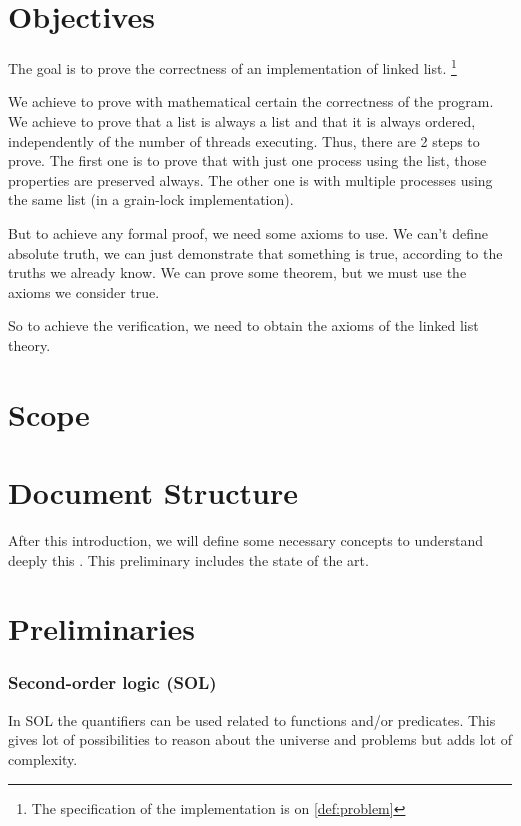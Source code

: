 \section{Objectives}

The goal is to prove the correctness of an implementation of linked list. \footnote{The specification of the implementation is on \ref{def:problem}}

We achieve to prove with mathematical certain the correctness of the program. We achieve to prove that a list is always a list and that it is always ordered, independently of the number of threads executing. Thus, there are 2 steps to prove. The first one is to prove that with just one process using the list, those properties are preserved always. The other one is with multiple processes using the same list (in a grain-lock implementation).

But to achieve any formal proof, we need some axioms to use.
We can't define absolute truth, we can just demonstrate that something is true, according to the truths we already know. 
We can prove some theorem, but we must use the axioms we consider true. 

So to achieve the verification, we need to obtain the axioms of the linked list theory.

\section{Scope}


\label{def:leap}

\section{Document Structure}

After this introduction, we will define some necessary concepts to understand deeply this \thisworkm. This preliminary includes the state of the art.


\section{Preliminaries}

\subsubsection{Second-order logic (SOL)}

In \gls{SOL} the quantifiers can be used related to functions and/or predicates. This gives lot of possibilities to reason about the universe and problems but adds lot of complexity. 

